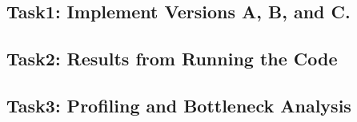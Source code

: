 \documentclass[a4paper,%
11pt,%
DIV12,
headsepline,%
headings=normal,
]{scrartcl}
\begin{document}
\subsection{Task1: Implement Versions A, B, and C.}

\subsection{Task2: Results from Running the Code}

\subsection{Task3: Profiling and Bottleneck Analysis}

\end{document}
